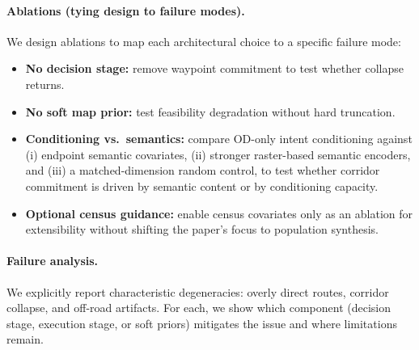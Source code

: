 \paragraph{Ablations (tying design to failure modes).}
We design ablations to map each architectural choice to a specific failure mode:
\begin{itemize}
  \item \textbf{No decision stage:} remove waypoint commitment to test whether collapse returns.
  \item \textbf{No soft map prior:} test feasibility degradation without hard truncation.
  \item \textbf{Conditioning vs.\ semantics:} compare OD-only intent conditioning against (i) endpoint semantic covariates, (ii) stronger raster-based semantic encoders, and (iii) a matched-dimension random control, to test whether corridor commitment is driven by semantic content or by conditioning capacity.
  \item \textbf{Optional census guidance:} enable census covariates only as an ablation for extensibility without shifting the paper's focus to population synthesis.
\end{itemize}

\paragraph{Failure analysis.}
We explicitly report characteristic degeneracies: overly direct routes, corridor collapse, and off-road artifacts.
For each, we show which component (decision stage, execution stage, or soft priors) mitigates the issue and where limitations remain.
